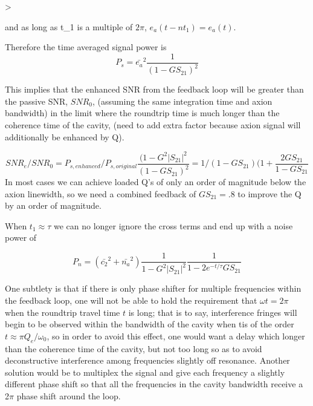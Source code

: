 >\documentclass[aps,prl,twocolumn,groupedaddress]{revtex4-1}
\begin{document}
and as long as \omega t_1 is a multiple of $2\pi$, $e_a(t-nt_1) = e_a(t)$.

Therefore the time averaged signal power is
\begin{equation}
P_s = \bar{e_a}^2\frac{1}{(1 - GS_{21})^2}
\end{equation}

This implies that the enhanced SNR from the feedback loop will be greater than the passive SNR, $SNR_0$, (assuming the same integration time and axion bandwidth) in the limit where the roundtrip time is much longer than the coherence time of the cavity, (need to add extra factor because axion signal will additionally be enhanced by Q).

\begin{equation}
SNR_{e}/SNR_{0} =P_{s, enhanced}/P_{s,original}\frac{(1-G^2|S_{21}|^2}{(1-GS_{21})^2} = 1/(1-GS_{21})(1 + \frac{2GS_{21}}{1-GS_{21}}
\end{equation}
In most cases we can achieve loaded Q's of only an order of magnitude below the axion linewidth, so we need a combined feedback of $GS_{21} = .8$ to improve the Q by an order of magnitude.

When $t_1 \approx \tau$ we can no longer ignore the cross terms and end up with a noise power of

\begin{equation}
P_n = (\bar{c_2}^2 + \bar{n_a}^2)\frac{1}{1 - G^2|S_{21}|^2}\frac{1}{1-2e^{-t/\tau}GS_{21}}
\end{equation}

One subtlety is that if there is only phase shifter for multiple frequencies within the feedback loop, one will not be able to hold the requirement that $\omega t = 2\pi$ when the roundtrip travel time $t$ is long; that is to say, interference fringes will begin to be observed within the bandwidth of the cavity when tis of the order $t \approx \pi Q_e / \omega_0$, so in order to avoid this effect, one would want a delay which longer than the coherence time of the cavity, but not too long so as to avoid deconstructive interference among frequencies slightly off resonance. Another solution would be to multiplex the signal and give each frequency a slightly different phase shift so that all the frequencies in the cavity bandwidth receive a 2$\pi$ phase shift around the loop.
\end{document}
